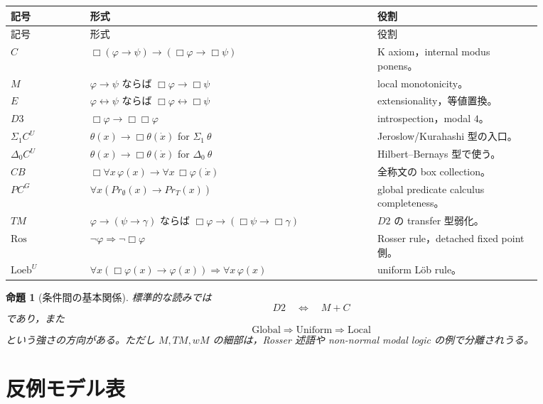 ﻿\documentclass[a4paper,10pt]{ltjsarticle}
\newtheorem{proposition}[theorem]{命題}
\newcommand{\Ros}{\mathrm{Ros}}
\newcommand{\Boxop}{\Box}
\begin{document}
\begin{longtable}{>{\raggedright\arraybackslash}p{0.13\linewidth}
>{\raggedright\arraybackslash}p{0.47\linewidth}
>{\raggedright\arraybackslash}p{0.27\linewidth}}
\toprule
記号 & 形式 & 役割 \\
\midrule
\endfirsthead
\toprule
記号 & 形式 & 役割 \\
\midrule
\endhead
\(C\) &
\(\Boxop(\varphi\to\psi)\to(\Boxop\varphi\to\Boxop\psi)\) &
K axiom，internal modus ponens。\\
\(M\) &
\(\varphi\to\psi\) ならば \(\Boxop\varphi\to\Boxop\psi\) &
local monotonicity。\\
\(E\) &
\(\varphi\leftrightarrow\psi\) ならば \(\Boxop\varphi\leftrightarrow\Boxop\psi\) &
extensionality，等値置換。\\
\(D3\) &
\(\Boxop\varphi\to\Boxop\Boxop\varphi\) &
introspection，modal \(4\)。\\
\(\Sigma_1 C^U\) &
\(\theta(x)\to\Boxop\theta(\dot x)\) for \(\Sigma_1\ \theta\) &
Jeroslow/Kurahashi 型の入口。\\
\(\Delta_0 C^U\) &
\(\theta(x)\to\Boxop\theta(\dot x)\) for \(\Delta_0\ \theta\) &
Hilbert--Bernays 型で使う。\\
\(CB\) &
\(\Boxop\forall x\,\varphi(x)\to\forall x\,\Boxop\varphi(\dot x)\) &
全称文の box collection。\\
\(PC^G\) &
\(\forall x(Pr_{\emptyset}(x)\to Pr_T(x))\) &
global predicate calculus completeness。\\
\(TM\) &
\(\varphi\to(\psi\to\gamma)\) ならば
\(\Boxop\varphi\to(\Boxop\psi\to\Boxop\gamma)\) &
\(D2\) の transfer 型弱化。\\
\(\Ros\) &
\(\neg\varphi\Rightarrow\neg\Boxop\varphi\) &
Rosser rule，detached fixed point 側。\\
\(\mathrm{Loeb}^U\) &
\(\forall x(\Boxop\varphi(x)\to\varphi(x))\Rightarrow\forall x\,\varphi(x)\) &
uniform Löb rule。\\
\bottomrule
\end{longtable}

\begin{proposition}[条件間の基本関係]
標準的な読みでは
\[
D2\quad\Longleftrightarrow\quad M+C
\]
であり，また
\[
\mathrm{Global}\Rightarrow\mathrm{Uniform}\Rightarrow\mathrm{Local}
\]
という強さの方向がある。ただし \(M,TM,wM\) の細部は，Rosser 述語や non-normal
modal logic の例で分離されうる。
\end{proposition}

\section{反例モデル表}
\end{document}
